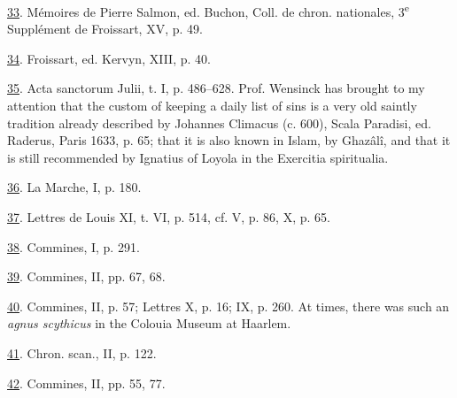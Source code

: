 \protect\hypertarget{23_NOTES.xhtmlux5cux23id_959}{\protect\hyperlink{14_Chapter_Seven__THE_PIOUS_PERSONA.xhtmlux5cux23id_958}{33}}.
Mémoires de Pierre Salmon, ed. Buchon, Coll. de chron. nationales,
3\textsuperscript{e} Supplément de Froissart, XV, p. 49.

\protect\hypertarget{23_NOTES.xhtmlux5cux23id_957}{\protect\hyperlink{14_Chapter_Seven__THE_PIOUS_PERSONA.xhtmlux5cux23id_956}{34}}.
Froissart, ed. Kervyn, XIII, p. 40.

\protect\hypertarget{23_NOTES.xhtmlux5cux23id_955}{\protect\hyperlink{14_Chapter_Seven__THE_PIOUS_PERSONA.xhtmlux5cux23id_954}{35}}.
Acta sanctorum Julii, t. I, p. 486--628. Prof. Wensinck has brought to
my attention that the custom of keeping a daily list of sins is a very
old saintly tradition already described by Johannes Climacus (c. 600),
Scala Paradisi, ed. Raderus, Paris 1633, p. 65; that it is also known in
Islam, by Ghazâlî, and that it is still recommended by Ignatius of
Loyola in the Exercitia spiritualia.

\protect\hypertarget{23_NOTES.xhtmlux5cux23id_953}{\protect\hyperlink{14_Chapter_Seven__THE_PIOUS_PERSONA.xhtmlux5cux23id_952}{36}}.
La Marche, I, p. 180.

\protect\hypertarget{23_NOTES.xhtmlux5cux23id_951}{\protect\hyperlink{14_Chapter_Seven__THE_PIOUS_PERSONA.xhtmlux5cux23id_950}{37}}.
Lettres de Louis XI, t. VI, p. 514, cf. V, p. 86, X, p. 65.

\protect\hypertarget{23_NOTES.xhtmlux5cux23id_949}{\protect\hyperlink{14_Chapter_Seven__THE_PIOUS_PERSONA.xhtmlux5cux23id_948}{38}}.
Commines, I, p. 291.

\protect\hypertarget{23_NOTES.xhtmlux5cux23id_947}{\protect\hyperlink{14_Chapter_Seven__THE_PIOUS_PERSONA.xhtmlux5cux23id_946}{39}}.
Commines, II, pp. 67, 68.

\protect\hypertarget{23_NOTES.xhtmlux5cux23page_422}{\protect\hyperlink{14_Chapter_Seven__THE_PIOUS_PERSONA.xhtmlux5cux23id_945}{40}}.
Commines, II, p. 57; Lettres X, p. 16; IX, p. 260. At times, there was
such an \emph{agnus scythicus} in the Colouia Museum at Haarlem.

\protect\hypertarget{23_NOTES.xhtmlux5cux23id_944}{\protect\hyperlink{14_Chapter_Seven__THE_PIOUS_PERSONA.xhtmlux5cux23id_943}{41}}.
Chron. scan., II, p. 122.

\protect\hypertarget{23_NOTES.xhtmlux5cux23id_942}{\protect\hyperlink{14_Chapter_Seven__THE_PIOUS_PERSONA.xhtmlux5cux23id_941}{42}}.
Commines, II, pp. 55, 77.

